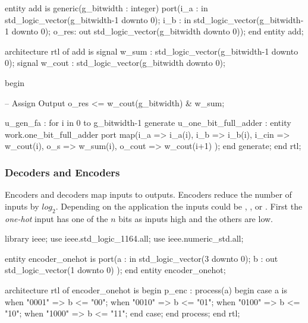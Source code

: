 \begin{VHDLlisting}[tabsize=4]
entity add is
generic(g_bitwidth : integer)
port(i_a  : in    std_logic_vector(g_bitwidth-1 downto 0);  
     i_b  : in    std_logic_vector(g_bitwidth-1 downto 0);  
	 o_res:   out std_logic_vector(g_bitwidth downto 0));
end entity add;

architecture rtl of add is 
    signal w_sum  : std_logic_vector(g_bitwidth-1 downto 0); 
    signal w_cout : std_logic_vector(g_bitwidth downto 0);
	
begin 

    -- Assign Output 
    o_res <= w_cout(g_bitwidth) & w_sum; 
	
    u_gen_fa : for i in 0 to g_bitwidth-1 generate  
        u_one_bit_full_adder : entity work.one_bit_full_adder  
        port map(i_a    => i_a(i),
                 i_b    => i_b(i),
                 i_cin  => w_cout(i),
                 o_s    => w_sum(i),
                 o_cout => w_cout(i+1)
        );  
    end generate;
end rtl;
\end{VHDLlisting}


	
\subsubsection{Decoders and Encoders}
	
Encoders and decoders map inputs to outputs. Encoders reduce the number of inputs by $log_2$. Depending on the application the inputs could be \emph{}, \emph{}, or \emph{}. First the \emph{one-hot} input has one of the $n$ bits as inputs high and the others are low.

\begin{VHDLlisting}[tabsize=4]
library ieee;
  use ieee.std_logic_1164.all;
  use ieee.numeric_std.all;
  
entity encoder_onehot is
port(a : in    std_logic_vector(3 downto 0);
     b :   out std_logic_vector(1 downto 0)
);
end entity encoder_onehot;

architecture rtl of encoder_onehot is
begin
    p_enc : process(a)
    begin
        case a is	
            when "0001" => 
                b <= "00";
            when "0010" => 
                b <= "01";
            when "0100" => 
                b <= "10";
            when "1000" => 
                b <= "11";
        end case;
    end process;
end rtl;
\end{VHDLlisting}

